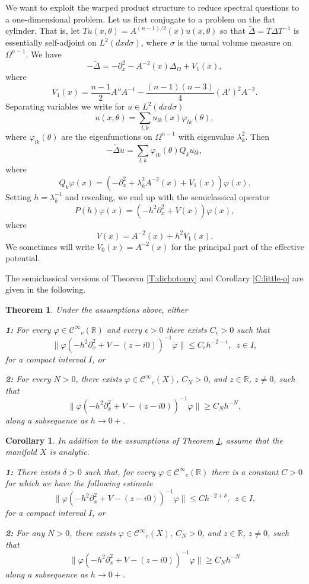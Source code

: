 \documentclass[twoside, final]{amsart}
\newtheorem{theorem}{Theorem}
\newtheorem{corollary}[proposition]{Corollary}
\theoremstyle{definition}
\numberwithin{equation}{section}
\begin{document}
We want to exploit the warped product structure to reduce spectral questions
to a one-dimensional problem.  Let us first conjugate to a problem on
the flat cylinder.  That is, let $Tu(x, \theta) = A^{(n-1)/2}(x) u(x,
\theta)$ so that ${\widetilde{\Delta}} = T \Delta T^{-1}$ is essentially
self-adjoint on $L^2(dx d \sigma)$, where $\sigma$ is the usual
volume measure on $\Omega^{n-1}$.  We have
\[
-{\widetilde{\Delta}} = -{\partial}_x^2 - A^{-2}(x) \Delta_\Omega + V_1(x),
\]
where
\[
V_1(x) = \frac{n-1}{2} A'' A^{-1} - \frac{(n-1)(n-3)}{4} (A')^2 A^{-2}.
\]
Separating variables we write for $u \in L^2(dx d \sigma)$ 
\[
u(x, \theta) = \sum_{l,k} u_{lk}(x) {\varphi}_{lk}(\theta),
\]
where ${\varphi}_{lk}(\theta)$ are the eigenfunctions on $\Omega^{n-1}$ with eigenvalue
$\lambda_k^2$.  Then
\[
-{\widetilde{\Delta}} u = \sum_{l,k} {\varphi}_{lk}(\theta) Q_k u_{lk},
\]
where
\[
Q_k {\varphi}(x) = ( -{\partial}_x^2 + \lambda_k^2 A^{-2}(x) + V_1(x) ) {\varphi}(x).
\]
Setting $h = \lambda_k^{-1}$ and rescaling, we end up with the
semiclassical operator
\[
P(h) {\varphi}(x) = (-h^2 {\partial}_x^2 + V(x) ) {\varphi}(x),
\]
where
\[
V(x) = A^{-2}(x) + h^2V_1(x).
\]
We sometimes will write $V_0(x) = A^{-2}(x)$ for the principal part of
the effective potential.

The semiclassical versions of Theorem \ref{T:dichotomy} and Corollary
\ref{C:little-o} are given in the following.

\begin{theorem}
\label{T:dichotomy-sc}
Under the assumptions above, either 

{\bf 1:}  For every ${\varphi} \in {{\mathcal C}^\infty}_c({{\mathbb R}})$ and every $\epsilon>0$ there exists $C_\epsilon
>0$ such that
\[
\| {\varphi} (-h^2 {\partial}_x^2 + V -(z-i0))^{-1} {\varphi} \| {\leqslant} C_\epsilon h^{-2-\epsilon} ,
\,\,\, z \in I,
\]
for a compact interval $I$, or

{\bf 2:} For every $N>0$, there exists ${\varphi} \in {{\mathcal C}^\infty}_c(X)$, $C_N>0$,  and $z \in {{\mathbb R}}$, $z \neq 0$,  such that 
\[
\| {\varphi} (-h^2{\partial}_x^2 + V - (z-i0))^{-1} {\varphi} \| {\geqslant} C_N h^{-N},
\]
along a subsequence as $h \to 0+$.

\end{theorem}

\begin{corollary}
\label{C:little-o-sc}
In addition to the assumptions of Theorem \ref{T:dichotomy-sc}, assume
that the manifold $X$ is analytic.

{\bf 1:}  There exists $\delta>0$ such that, for every ${\varphi} \in
{{\mathcal C}^\infty}_c({{\mathbb R}})$ there is a constant  $C
>0$ for which we have the following estimate
\[
\| {\varphi} (-h^2 {\partial}_x^2 + V -(z-i0))^{-1} {\varphi} \|  {\leqslant} C h^{-2+\delta} ,
\,\,\, z \in I,
\]
for a compact interval $I$, or

{\bf 2:} For any $N>0$, there exists ${\varphi} \in {{\mathcal C}^\infty}_c(X)$, $C_N>0$, and $z \in {{\mathbb R}}$, $z \neq 0$, such that 
\[
\| {\varphi} (-h^2{\partial}_x^2 + V - (z-i0))^{-1} {\varphi} \| {\geqslant} C_N h^{-N}
\]
along a subsequence as $h \to 0+$.

\end{corollary}
\end{document}

